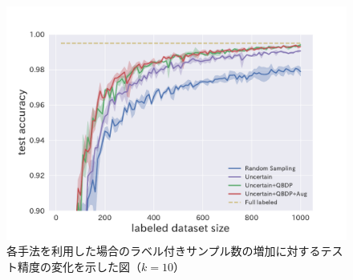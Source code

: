 
\begin{figure}[h]
     \begin{center}
      \includegraphics[width=12cm]{figures/mnist_acc_graph.pdf}
     \end{center}
    \caption{\label{fig:mnist_acc_graph}各手法を利用した場合のラベル付きサンプル数の増加に対するテスト精度の変化を示した図（$k=10$）}
\end{figure}


